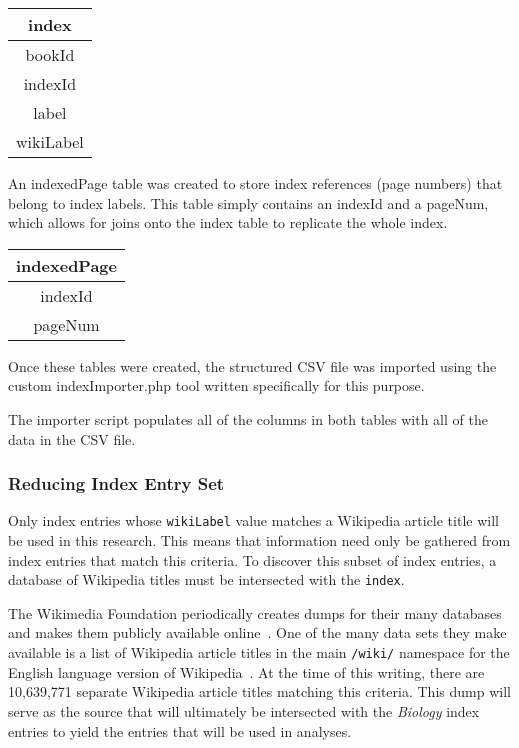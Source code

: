 \begin{center}
\begin{tabular}{|c|}
\hline 
\textbf{index} \\ 
\hline 
bookId \\ 
\hline 
indexId \\ 
\hline 
label \\ 
\hline 
wikiLabel \\ 
\hline 
\end{tabular}
\end{center}
 
An indexedPage table was created to store index references (page numbers) that belong to index labels.
This table simply contains an indexId and a pageNum, which allows for joins onto the index table to replicate the whole index.

\begin{center}
\begin{tabular}{|c|}
\hline 
\textbf{indexedPage} \\ 
\hline 
indexId \\ 
\hline 
pageNum \\ 
\hline 
\end{tabular} 
\end{center}

Once these tables were created, the structured CSV file was imported using the custom indexImporter.php tool written specifically for this purpose.

The importer script populates all of the columns in both tables with all of the data in the CSV file.

\subsubsection{Reducing Index Entry Set}
\label{subsec:reducing}

Only index entries whose {\tt wikiLabel} value matches a Wikipedia article title will be used in this research.
This means that information need only be gathered from index entries that match this criteria.
To discover this subset of index entries, a database of Wikipedia titles must be intersected with the {\tt index}.

The Wikimedia Foundation periodically creates dumps for their many databases and makes them publicly available online~\cite{wiki-dumps}.
One of the many data sets they make available is a list of Wikipedia article titles in the main {\tt /wiki/} namespace for the English language version of Wikipedia~\cite{wiki-dump-titles}.
At the time of this writing, there are 10,639,771 separate Wikipedia article titles matching this criteria.
This dump will serve as the source that will ultimately be intersected with the {\it Biology} index entries to yield the entries that will be used in analyses.


